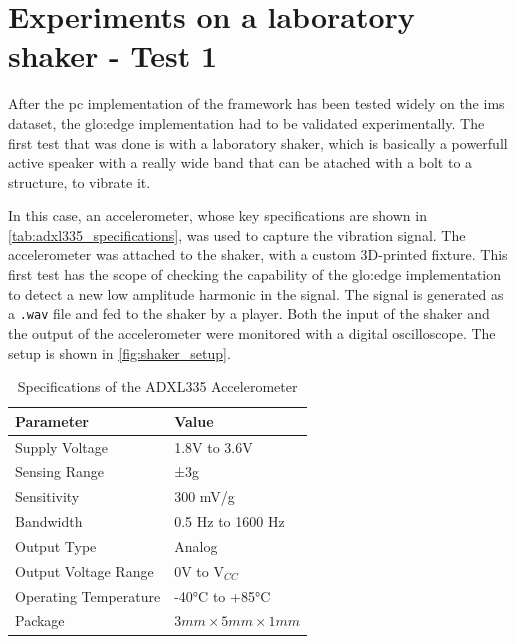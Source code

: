 \section{Experiments on a laboratory shaker - Test 1}
\label{sec:shaker_test01}

After the \gls{pc} implementation of the framework has been tested widely on the \gls{ims} dataset, the \gls{glo:edge} implementation had to be validated experimentally. The first test that was done is with a laboratory shaker, which is basically a powerfull active speaker with a really wide band that can be atached with a bolt to a structure, to vibrate it.

In this case, an accelerometer, whose key specifications are shown in \autoref{tab:adxl335_specifications}, was used to capture the vibration signal. The accelerometer was attached to the shaker, with a custom 3D-printed fixture. This first test has the scope of checking the capability of the \gls{glo:edge} implementation to detect a new low amplitude harmonic in the signal. The signal is generated as a \texttt{.wav} file and fed to the shaker by a player. Both the input of the shaker and the output of the accelerometer were monitored with a digital oscilloscope. The setup is shown in \autoref{fig:shaker_setup}.



\begin{table}[h]
    \centering
    \caption{Specifications of the ADXL335 Accelerometer}
    \label{tab:adxl335_specifications}
    \begin{tabular}{ll} 
    \toprule
    \textbf{Parameter} & \textbf{Value} \\ 
    \hline
    Supply Voltage & 1.8V to 3.6V \\
    Sensing Range & ±3g \\
    Sensitivity & 300 mV/g \\
    Bandwidth & 0.5 Hz to 1600 Hz \\
    Output Type & Analog \\
    Output Voltage Range & 0V to V$_{CC}$ \\
    Operating Temperature & -40°C to +85°C \\
    Package & $3\si{mm} \times 5 \si{mm} \times 1 \si{mm}$ \\
    \bottomrule
    \end{tabular}
\end{table}

